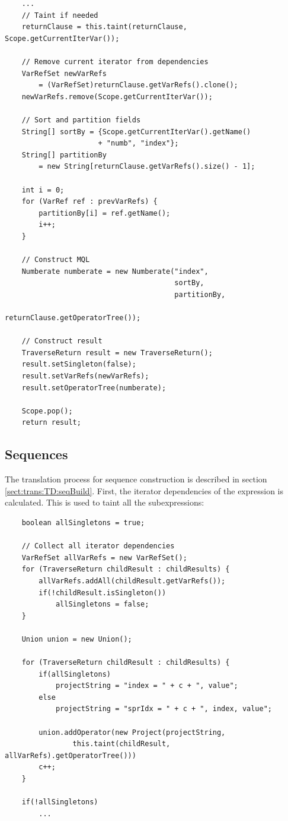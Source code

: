 \begin{Verbatim}
    ...
    // Taint if needed
    returnClause = this.taint(returnClause, Scope.getCurrentIterVar());

    // Remove current iterator from dependencies
    VarRefSet newVarRefs 
    	= (VarRefSet)returnClause.getVarRefs().clone();         
    newVarRefs.remove(Scope.getCurrentIterVar());

    // Sort and partition fields
    String[] sortBy = {Scope.getCurrentIterVar().getName() 
    		          + "numb", "index"};
    String[] partitionBy 
    	= new String[returnClause.getVarRefs().size() - 1];

    int i = 0;
    for (VarRef ref : prevVarRefs) {
        partitionBy[i] = ref.getName();
        i++;
    }

    // Construct MQL
    Numberate numberate = new Numberate("index", 
                                        sortBy, 
                                        partitionBy, 
                                        returnClause.getOperatorTree());

    // Construct result
    TraverseReturn result = new TraverseReturn();
    result.setSingleton(false);
    result.setVarRefs(newVarRefs);
    result.setOperatorTree(numberate);

    Scope.pop();
    return result;
\end{Verbatim}


\subsection{Sequences}
\label{sect:impl:td:seq}
The translation process for sequence construction is described in section
\ref{sect:trans:TD:seqBuild}. First, the iterator dependencies of the expression is calculated. This is used to
taint all the subexpressions:

\begin{Verbatim}
    boolean allSingletons = true;    

    // Collect all iterator dependencies
    VarRefSet allVarRefs = new VarRefSet();
    for (TraverseReturn childResult : childResults) {
        allVarRefs.addAll(childResult.getVarRefs());
        if(!childResult.isSingleton())
            allSingletons = false;
    }

    Union union = new Union();

    for (TraverseReturn childResult : childResults) {
        if(allSingletons)
            projectString = "index = " + c + ", value";
        else
            projectString = "sprIdx = " + c + ", index, value";

        union.addOperator(new Project(projectString, 
                this.taint(childResult, allVarRefs).getOperatorTree()))
        c++;    
    }
    
    if(!allSingletons)
        ...
\end{Verbatim}

